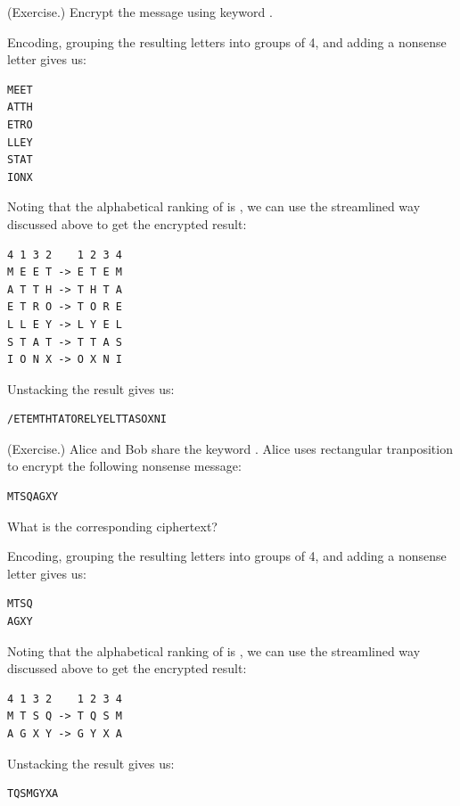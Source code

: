 \documentclass[letterpaper]{article}
\begin{document}
\begin{mdframed}
    (Exercise.) Encrypt the message  using keyword .

    \begin{mdframed}
        Encoding, grouping the resulting letters into groups of 4, and adding a nonsense letter gives us: 
        \begin{verbatim}
MEET
ATTH
ETRO
LLEY
STAT
IONX\end{verbatim}
        Noting that the alphabetical ranking of  is , we can use the streamlined way discussed above to get the encrypted result:
        \begin{mdframed}
            \begin{verbatim}
4 1 3 2    1 2 3 4
M E E T -> E T E M
A T T H -> T H T A
E T R O -> T O R E
L L E Y -> L Y E L
S T A T -> T T A S
I O N X -> O X N I\end{verbatim}
        \end{mdframed}
        Unstacking the result gives us:
        \begin{mdframed}
            \begin{verbatim}
/ETEMTHTATORELYELTTASOXNI\end{verbatim}
        \end{mdframed}
    \end{mdframed}
\end{mdframed}

\begin{mdframed}
    (Exercise.) Alice and Bob share the keyword . Alice uses rectangular tranposition to encrypt the following nonsense message: 
    \begin{verbatim}
MTSQAGXY\end{verbatim}
    What is the corresponding ciphertext? 
    \begin{mdframed}
        Encoding, grouping the resulting letters into groups of 4, and adding a nonsense letter gives us: 
        \begin{mdframed}
            \begin{verbatim}
MTSQ
AGXY\end{verbatim}
        \end{mdframed}
        Noting that the alphabetical ranking of  is , we can use the streamlined way discussed above to get the encrypted result:
        \begin{mdframed}
            \begin{verbatim}
4 1 3 2    1 2 3 4
M T S Q -> T Q S M
A G X Y -> G Y X A\end{verbatim}
        \end{mdframed}
        Unstacking the result gives us:
        \begin{mdframed}
            \begin{verbatim}
TQSMGYXA\end{verbatim}
    \end{mdframed}
    \end{mdframed}
\end{mdframed}
\end{document}
